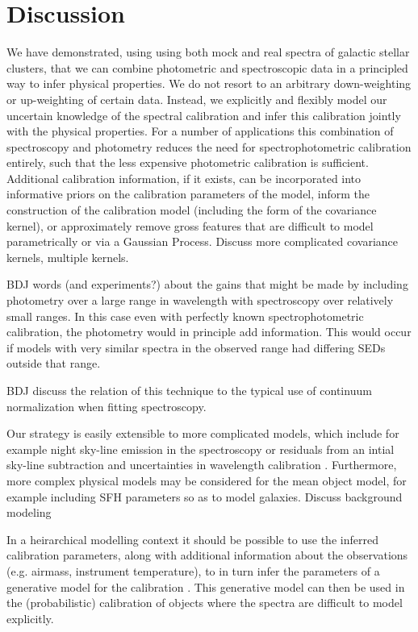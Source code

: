 \documentclass[iop,numberedappendix]{emulateapj}
\begin{document}
\section{Discussion}

We have demonstrated, using using both mock and real spectra of
galactic stellar clusters, that we can combine photometric and
spectroscopic data in a principled way to infer physical properties.
We do not resort to an arbitrary down-weighting or up-weighting of
certain data. Instead, we explicitly and flexibly model our uncertain
knowledge of the spectral calibration and infer this calibration
jointly with the physical properties. For a number of applications
this combination of spectroscopy and photometry reduces the need for
spectrophotometric calibration entirely, such that the less expensive
photometric calibration is sufficient.  Additional calibration
information, if it exists, can be incorporated into informative priors
on the calibration parameters of the model, inform the construction of
the calibration model (including the form of the covariance kernel),
or approximately remove gross features that are difficult to model
parametrically or via a Gaussian Process.  {\color{blue} Discuss more
complicated covariance kernels, multiple kernels.}

{\color{blue} BDJ words (and experiments?) about the gains that might
be made by including photometry over a large range in wavelength with
spectroscopy over relatively small ranges.}  In this case even with
perfectly known spectrophotometric calibration, the photometry would
in principle add information.  This would occur if models with very
similar spectra in the observed range had differing SEDs outside that
range.

{\color{blue} BDJ discuss the relation of this technique to the typical use of
continuum normalization when fitting spectroscopy.}

Our strategy is easily extensible to more complicated models, which
include for example night sky-line emission in the spectroscopy
\citep[e.g.,][]{gullikson14} or residuals from an intial sky-line
subtraction and uncertainties in wavelength calibration
\citep[e.g.,][]{walker15}. Furthermore, more complex physical models
may be considered for the mean object model, for example including SFH
parameters so as to model galaxies. {\color{blue} Discuss background
modeling}

In a heirarchical modelling context it should be possible to use the
inferred calibration parameters, along with additional information
about the observations (e.g. airmass, instrument temperature), to in
turn infer the parameters of a generative model for the calibration
\citep[e.g.][]{spectrophot}. This generative model can then be used in
the (probabilistic) calibration of objects where the spectra are
difficult to model explicitly.
\end{document}
